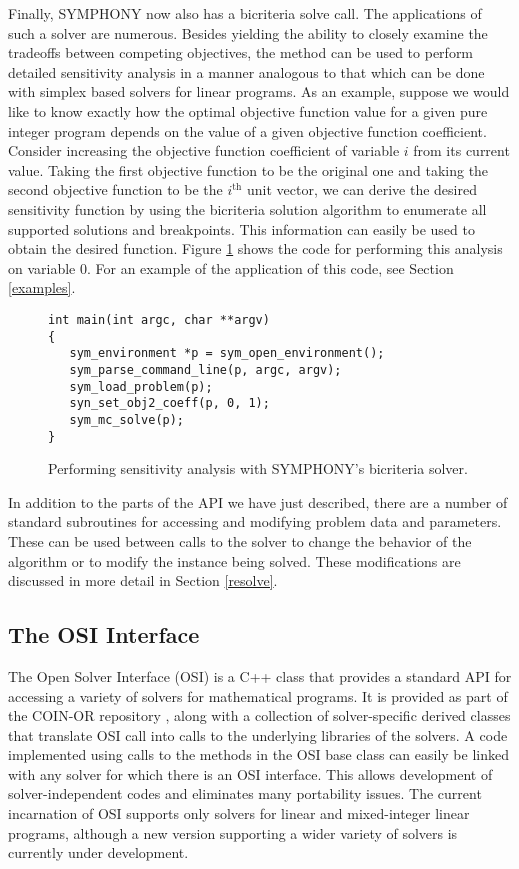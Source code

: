 Finally, SYMPHONY now also has a bicriteria solve call. The applications of
such a solver are numerous. Besides yielding the ability to closely examine
the tradeoffs between competing objectives, the method can be used to perform
detailed sensitivity analysis in a manner analogous to that which can be done
with simplex based solvers for linear programs. As an example, suppose we
would like to know exactly how the optimal objective function value for a
given pure integer program depends on the value of a given objective function
coefficient. Consider increasing the objective function
coefficient of variable $i$ from its current value. Taking the first objective
function to be the original one and taking the second objective function to be
the $i^\textrm{th}$ unit vector, we can derive the desired sensitivity
function by using the bicriteria solution algorithm to enumerate all supported
solutions and breakpoints. This information can easily be used to obtain the
desired function. Figure \ref{multi_criteria} shows the code for performing
this analysis on variable 0. For an example of the application of this code,
see Section \ref{examples}.
\begin{figure}[tb]
\begin{Verbatim}[frame=lines]
int main(int argc, char **argv)
{
   sym_environment *p = sym_open_environment();
   sym_parse_command_line(p, argc, argv);
   sym_load_problem(p);
   syn_set_obj2_coeff(p, 0, 1);
   sym_mc_solve(p);
}
\end{Verbatim}
\caption{Performing sensitivity analysis with SYMPHONY's bicriteria solver. 
\label{multi_criteria}}
\end{figure}

In addition to the parts of the API we have just described, there are a number
of standard subroutines for accessing and modifying problem data and
parameters. These can be used between calls to the solver to change the
behavior of the algorithm or to modify the instance being solved. These
modifications are discussed in more detail in Section \ref{resolve}.

\subsection{The OSI Interface}\label{OSI}

The Open Solver Interface (OSI) is a C++ class that provides a standard API
for accessing a variety of solvers for mathematical programs. It is provided
as part of the COIN-OR repository \cite{coin-or}, along with a collection of
solver-specific derived classes that translate OSI call into calls to the
underlying libraries of the solvers. A code implemented using calls to the
methods in the OSI base class can easily be linked with any solver for which
there is an OSI interface. This allows development of solver-independent codes
and eliminates many portability issues. The current incarnation of OSI
supports only solvers for linear and mixed-integer linear programs, although a
new version supporting a wider variety of solvers is currently under
development.

